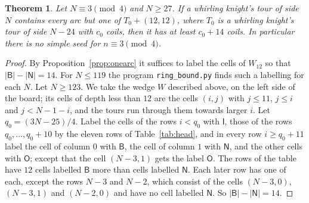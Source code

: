 \documentclass[11pt]{amsart}
\newtheorem{theorem}{Theorem}
\theoremstyle{remark}
\begin{document}
\begin{theorem}\label{thm:onearc}
Let $N\equiv3\pmod 4$ and $N\ge27$. If a whirling knight's tour of side $N$ contains every arc but one of
$T_0+(12,12)$, where $T_0$ is a whirling knight's tour of side $N-24$ with $c_0$ coils, then it has at least $c_0+14$
coils. In particular there is no simple seed for $n\equiv3\pmod 4$.
\end{theorem}
\begin{proof}
By Proposition~\ref{prop:onearc} it suffices to label the cells of $W_{12}$ so that $|\mathsf B|-|\mathsf N|=14$.
For $N\le119$ the program \texttt{ring\_bound.py} finds such a labelling for each $N$. Let $N\ge123$. We take the
wedge $W$ described above, on the left side of the board; its cells of depth less than $12$ are the cells $(i,j)$
with $j\le11$, $j\le i$ and $j<N-1-i$, and the tours run through them towards larger $i$. Let
$q_0=(3N-25)/4$. Label the cells of the rows $i<q_0$ with $\mathsf I$, those of the rows $q_0,\dots,q_0+10$ by the
eleven rows of Table~\ref{tab:head}, and in every row $i\ge q_0+11$ label the cell of column $0$ with $\mathsf B$,
the cell of column $1$ with $\mathsf N$, and the other cells with $\mathsf O$; except that the cell $(N-3,1)$ gets
the label $\mathsf O$. The rows of the table have $12$ cells labelled $\mathsf B$ more than cells labelled
$\mathsf N$. Each later row has one of each, except the rows $N-3$ and $N-2$, which consist of the cells $(N-3,0)$,
$(N-3,1)$ and $(N-2,0)$ and have no cell labelled $\mathsf N$. So $|\mathsf B|-|\mathsf N|=14$.


\end{proof}
\end{document}
